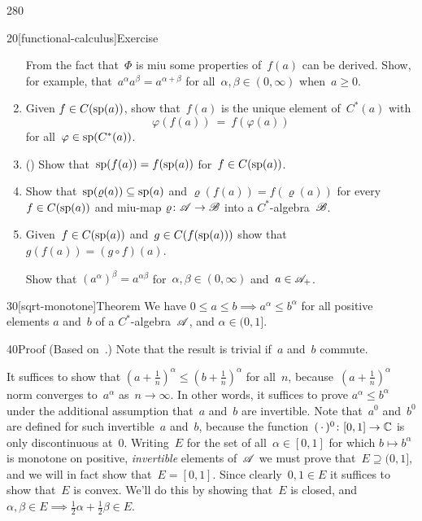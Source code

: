 \begin{parsec}{280}
\begin{point}{20}[functional-calculus]{Exercise}
\begin{enumerate}
From the fact that~$\Phi$ is miu some properties
of~$f(a)$ can be derived.
Show, for example,
that~$a^\alpha a^\beta = a^{\alpha+\beta}$
for all~$\alpha,\beta\in(0,\infty)$
when~$a\geq 0$.
\item
Given $f\in C(\mathrm{sp}(a))$,
show that~$f(a)$ is the unique element of~$C^*(a)$
with 
\begin{equation*}
	\varphi(f(a))
	 \ =\ f(\varphi(a))
\end{equation*}
for all~$\varphi\in\mathrm{sp}(C^*(a))$.
\item
()%
Show that~$\mathrm{sp}(f(a))=f(\mathrm{sp}(a))$
for~$f\in C(\mathrm{sp}(a))$.
\item
Show that~$\mathrm{sp}(\varrho(a))\subseteq
\mathrm{sp}(a)$
and $\varrho(f(a))=f(\varrho(a))$
for every $f\in C(\mathrm{sp}(a))$ and  miu-map
$\varrho\colon \mathscr{A}\to\mathscr{B}$
into a $C^*$-algebra~$\mathscr{B}$.
\item
Given~$f\in C(\mathrm{sp}(a))$ and~$g\in C(f(\mathrm{sp}(a)))$
show that $g(f(a))=(g\circ f)(a)$.

Show that $(a^\alpha)^\beta = a^{\alpha\beta}$
for~$\alpha,\beta\in (0,\infty)$
and~$a\in\mathscr{A}_+$.
\end{enumerate}
\end{point}
\begin{point}{30}[sqrt-monotone]{Theorem}%
We have $0\leq a\leq b \implies a^\alpha \leq b^\alpha$
for all positive elements $a$ and~$b$
of a $C^*$-algebra~$\mathscr{A}$,
and $\alpha\in (0,1]$.
\begin{point}{40}{Proof}%
(Based on~\cite{pedersen1972}.)
Note that the result is trivial if~$a$ and~$b$ commute.

It suffices to show that
$(a+\frac{1}{n})^\alpha \leq (b+\frac{1}{n})^\alpha$
for all~$n$,
because~$(a+\frac{1}{n})^\alpha$
norm converges to~$a^\alpha$
as~$n\to\infty$.
In other words,
it suffices to prove $a^\alpha \leq b^\alpha$
under the additional assumption that~$a$ and~$b$ are invertible.
Note that~$a^0$ and~$b^0$ are defined for such
invertible~$a$ and~$b$,
because the
function~$(\,\cdot\,)^0\colon [0,1]\to\mathbb{C}$
is only discontinuous at~$0$.
Writing~$E$ for the set of all~$\alpha\in[0,1]$
for which $b\mapsto b^\alpha$ is monotone
on positive,
\emph{invertible} elements of~$\mathscr{A}$
we must prove that~$E\supseteq(0,1]$,
and we will in fact show that~$E=[0,1]$.
Since clearly~$0,1\in E$
it suffices to show that~$E$ is convex.
We'll do this by showing that~$E$
is closed,
and $\alpha,\beta\in E\implies \frac{1}{2}\alpha 
+ \frac{1}{2}\beta \in E$.


\end{point}
\end{point}
\end{parsec}
